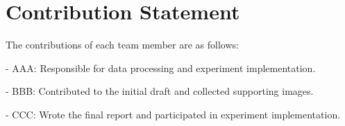 \section{Contribution Statement}
The contributions of each team member are as follows:
    
- AAA: Responsible for data processing and experiment implementation.
    
- BBB: Contributed to the initial draft and collected supporting images.
    
- CCC: Wrote the final report and participated in experiment implementation.
